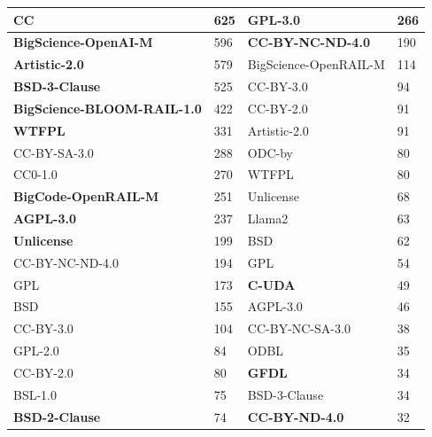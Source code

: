 \begin{table}[]
\begin{tabular}{|ll||ll|}
    \multicolumn{1}{|l|}{CC} & 625 & \multicolumn{1}{l|}{GPL-3.0} & 266 \\  \hline
    \multicolumn{1}{|l|}{\textbf{BigScience-OpenAI-M}} & 596 & \multicolumn{1}{l|}{\textbf{CC-BY-NC-ND-4.0}} & 190 \\ \hline
    \multicolumn{1}{|l|}{\textbf{Artistic-2.0}} & 579 & \multicolumn{1}{l|}{BigScience-OpenRAIL-M} & 114 \\ \hline
    \multicolumn{1}{|l|}{\textbf{BSD-3-Clause}} & 525 & \multicolumn{1}{l|}{CC-BY-3.0} & 94 \\ \hline
    \multicolumn{1}{|l|}{\textbf{BigScience-BLOOM-RAIL-1.0}} & 422 & \multicolumn{1}{l|}{CC-BY-2.0} & 91 \\ \hline
    \multicolumn{1}{|l|}{\textbf{WTFPL}} & 331 & \multicolumn{1}{l|}{Artistic-2.0} & 91 \\ \hline
    \multicolumn{1}{|l|}{CC-BY-SA-3.0} & 288 & \multicolumn{1}{l|}{ODC-by} & 80 \\ \hline
    \multicolumn{1}{|l|}{CC0-1.0} & 270 & \multicolumn{1}{l|}{WTFPL} & 80 \\ \hline
    \multicolumn{1}{|l|}{\textbf{BigCode-OpenRAIL-M}} & 251 & \multicolumn{1}{l|}{Unlicense} & 68 \\ \hline
    \multicolumn{1}{|l|}{\textbf{AGPL-3.0}} & 237 & \multicolumn{1}{l|}{Llama2} & 63 \\ \hline
    \multicolumn{1}{|l|}{\textbf{Unlicense}} & 199 & \multicolumn{1}{l|}{BSD} & 62 \\ \hline
    \multicolumn{1}{|l|}{CC-BY-NC-ND-4.0} & 194 & \multicolumn{1}{l|}{GPL} & 54 \\ \hline
    \multicolumn{1}{|l|}{GPL} & 173 & \multicolumn{1}{l|}{\textbf{C-UDA}} & 49 \\ \hline
    \multicolumn{1}{|l|}{BSD} & 155 & \multicolumn{1}{l|}{AGPL-3.0} & 46 \\ \hline
    \multicolumn{1}{|l|}{CC-BY-3.0} & 104 & \multicolumn{1}{l|}{CC-BY-NC-SA-3.0} & 38 \\ \hline
    \multicolumn{1}{|l|}{GPL-2.0} & 84 & \multicolumn{1}{l|}{ODBL} & 35 \\ \hline
    \multicolumn{1}{|l|}{CC-BY-2.0} & 80 & \multicolumn{1}{l|}{\textbf{GFDL}} & 34 \\ \hline
    \multicolumn{1}{|l|}{BSL-1.0} & 75 & \multicolumn{1}{l|}{BSD-3-Clause} & 34 \\ \hline
    \multicolumn{1}{|l|}{\textbf{BSD-2-Clause}} & 74 & \multicolumn{1}{l|}{\textbf{CC-BY-ND-4.0}} & 32 \\ \hline

\end{tabular}
\end{table}
